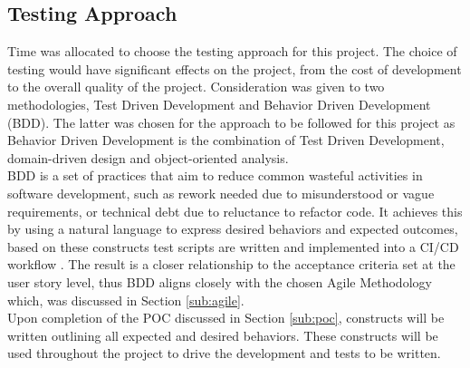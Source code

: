 \subsection{Testing Approach}
Time was allocated to choose the testing approach for this project. The choice of testing would have significant effects on the project, from the cost of development to the overall quality of the project. Consideration was given to two methodologies, Test Driven Development and Behavior Driven Development (BDD). The latter was chosen for the approach to be followed for this project as Behavior Driven Development is the combination of Test Driven Development, domain-driven design and object-oriented analysis. 
\\BDD is a set of practices that aim to reduce common wasteful activities in software development, such as rework needed due to misunderstood or vague requirements, or technical debt due to reluctance to refactor code. It achieves this by using a natural language to express desired behaviors and expected outcomes, based on these constructs test scripts are written and implemented into a CI/CD workflow \citep{solis_wang}. The result is a closer relationship to the acceptance criteria set at the user story level, thus BDD aligns closely with the chosen Agile Methodology which, was discussed in Section \ref{sub:agile}. 
\\Upon completion of the POC discussed in Section \ref{sub:poc}, constructs will be written outlining all expected and desired behaviors. These constructs will be used throughout the project to drive the development and tests to be written.

